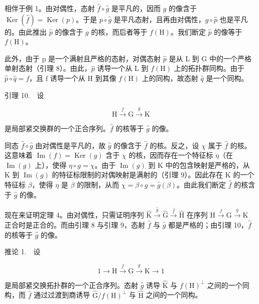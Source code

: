 相伴于例 1。由对偶性，态射 \(\widehat{f} \circ \widehat{g}\) 是平凡的，因而 \(\widehat{g}\) 的像含于 \(\operatorname{Ker}(\widehat{f}) = \operatorname{Ker}(p)\)。于是 \(p \circ \widehat{g}\) 是平凡态射，且再由对偶性，\(g \circ \widehat{p}\) 也是平凡的。由此推出 \(\widehat{p}\) 的像含于 \(g\) 的核，而后者等于 \(f(\mathrm{H})\)。我们断定 \(\widehat{p}\) 的像等于 \(f(\mathrm{H})\)。

此外，由于 p 是一个满射且严格的态射，对偶态射 \(\widehat{p}\) 是从 L 到 G 中的一个严格单射态射（引理 8）。由此，\(\widehat{p}\) 诱导一个从 L 到 \(f(\mathrm{H})\) 上的拓扑群同构。由于 \(\widehat{p} \circ \widehat{q} = f\)，且 f 诱导一个从 H 到其像 \(f(\mathrm{H})\) 上的同构，故态射 \(\widehat{q}\) 是一个同构。

引理 10.　设

\[
\mathrm{H} \xrightarrow {f} \mathrm{G} \xrightarrow {g} \mathrm{K}
\]

是局部紧交换群的一个正合序列。\(\hat{f}\) 的核等于 \(\hat{g}\) 的像。

同态 \(\widehat{f} \circ \widehat{g}\) 由对偶性是平凡的，故 \(\widehat{g}\) 的像含于 \(\widehat{f}\) 的核。反之，设 \(\chi\) 属于 \(\widehat{f}\) 的核。这意味着 \(\operatorname{Im}(f) = \operatorname{Ker}(g)\) 含于 \(\chi\) 的核，因而存在一个特征标 \(\eta\)（在 \(\operatorname{Im}(g)\) 上），使得 \(\eta \circ g = \chi\)。由于 \(\operatorname{Im}(g)\) 到 K 中的包含映射是严格的，从 K 到 \(\operatorname{Im}(g)\) 的特征标限制的对偶映射是满射的（引理 9）。因此存在 K 的一个特征标 \(\beta\)，使得 \(\eta\) 是 \(\beta\) 的限制，从而 \(\chi = \beta \circ g = \widehat{g}(\beta)\)。由此我们断定 \(\widehat{f}\) 的核含于 \(\widehat{g}\) 的像。

现在来证明定理 4。由对偶性，只需证明序列 \(\widehat{\mathrm{K}}\xrightarrow{\widehat{g}}\widehat{\mathrm{G}}\xrightarrow{\widehat{f}}\widehat{\mathrm{H}}\) 在序列 \(\mathrm{H}\xrightarrow{f}\mathrm{G}\xrightarrow{g}\mathrm{K}\) 正合时是正合的。而由引理 8 与引理 9，态射 \(\widehat{f}\) 与 \(\widehat{g}\) 都是严格的；由引理 10，\(\widehat{f}\) 的核等于 \(\widehat{g}\) 的像。

推论 1.　设

\[
1 \to \mathrm{H} \xrightarrow {f} \mathrm{G} \xrightarrow {g} \mathrm{K} \to 1
\]

是局部紧交换拓扑群的一个正合序列。态射 \(\widehat{g}\) 诱导 \(\widehat{\mathrm{K}}\) 与 \(f(\mathrm{H})^{\perp}\) 之间的一个同构，而 \(\widehat{f}\) 通过过渡到商诱导 \(\widehat{\mathrm{G}} / f(\mathrm{H})^{\perp}\) 与 \(\widehat{\mathrm{H}}\) 之间的一个同构。

